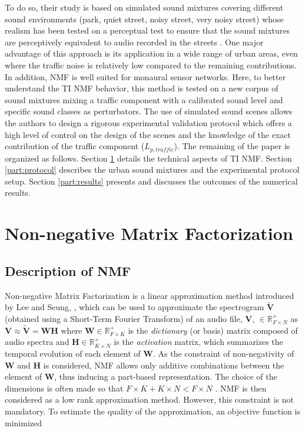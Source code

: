 \documentclass[12pt,english,twoside]{article}
\begin{document}
To do so, their study is based on simulated sound mixtures covering different sound environments (park, quiet street, noisy street, very noisy street) whose realism has been tested on a perceptual test to ensure that the sound mixtures are perceptively equivalent to audio recorded in the streets \cite{gloaguen2017creation}.
One major advantage of this approach is its application in a wide range of urban areas, even where the traffic noise is relatively low compared to the remaining contributions. In addition, NMF is well suited for monaural sensor networks.
Here, to better understand the TI NMF behavior, this method is tested on a new corpus of sound mixtures mixing a traffic component with a calibrated sound level and specific sound classes as perturbators. The use of simulated sound scenes allows the authors to design a rigorous experimental validation protocol which offers a high level of control on the design of the scenes and the knowledge of the exact contribution of the traffic component ($L_{p,traffic}$).
The remaining of the paper is organized as follows. Section \ref{part:nmf} details the technical aspects of TI NMF. Section \ref{part:protocol} describes the urban sound mixtures and the experimental protocol setup. Section \ref{part:results} presents and discusses the outcomes of the numerical results.

\section{Non-negative Matrix Factorization}\label{part:nmf}
\subsection{Description of NMF}

Non-negative Matrix Factorization is a linear approximation method introduced by Lee and Seung, \cite{lee_learning_1999}, which can be used to approximate the spectrogram $\mathbf{\tilde{V}}$ (obtained using a Short-Term Fourier Transform) of an audio file, $\mathbf{V}$, $\in \mathbb{R}^+_{F \times N}$ as $\mathbf{V} \approx \mathbf{\tilde{V}} = \mathbf{WH}$
where $\mathbf{W} \in \mathbb{R}^+_{F \times K}$ is the \textit{dictionary} (or basis) matrix composed of audio spectra and $\mathbf{H} \in \mathbb{R}^+_{K \times N}$ is the \textit{activation} matrix, which summarizes the temporal evolution of each element of $\mathbf{W}$. As the constraint of non-negativity of $\mathbf{W}$ and $\mathbf{H}$ is considered, NMF allows only additive combinations between the element of $\mathbf{W}$, thus inducing a part-based representation.
The choice of the dimensions is often made so that $F\times K + K \times N < F \times N$ \cite{fevotte_nonnegative_2009}. NMF is then considered as a low rank approximation method. However, this constraint is not mandatory. To estimate the quality of the approximation, an objective function is minimized
\end{document}

